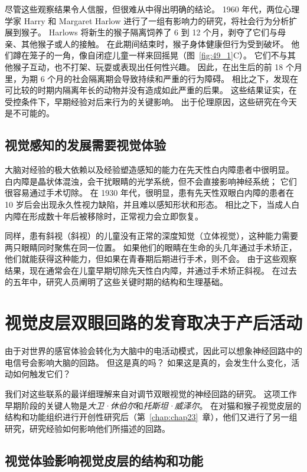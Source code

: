 尽管这些观察结果令人信服，但很难从中得出明确的结论。
1960 年代，两位心理学家 Harry 和 Margaret Harlow 进行了一组有影响力的研究，将社会行为分析扩展到猴子。
Harlows 将新生的猴子隔离饲养了 6 到 12 个月，剥夺了它们与母亲、其他猴子或人的接触。
在此期间结束时，猴子身体健康但行为受到破坏。 他们蹲在笼子的一角，像自闭症儿童一样来回摇晃（图~\ref{fig:49_1}C）。
它们不与其他猴子互动，也不打架、玩耍或表现出任何性兴趣。
因此，在出生后的前 18 个月里，为期 6 个月的社会隔离期会导致持续和严重的行为障碍。
相比之下，发现在可比较的时期内隔离年长的动物并没有造成如此严重的后果。
这些结果证实，在受控条件下，早期经验对后来行为的关键影响。
出于伦理原因，这些研究在今天是不可能的。



\subsection{视觉感知的发展需要视觉体验}

大脑对经验的极大依赖以及经验塑造感知的能力在先天性白内障患者中很明显。
白内障是晶状体混浊，会干扰眼睛的光学系统，但不会直接影响神经系统；
它们很容易通过手术切除。
在 1930 年代，很明显，患有先天性双眼白内障的患者在 10 岁后会出现永久性视力缺陷，并且难以感知形状和形态。
相比之下，当成人白内障在形成数十年后被移除时，正常视力会立即恢复。


同样，患有斜视（斜视）的儿童没有正常的深度知觉（立体视觉），这种能力需要两只眼睛同时聚焦在同一位置。
如果他们的眼睛在生命的头几年通过手术矫正，他们就能获得这种能力，但如果在青春期后期进行手术，则不会。
由于这些观察结果，现在通常会在儿童早期切除先天性白内障，并通过手术矫正斜视。
在过去的五年中，研究人员阐明了这些关键时期的结构和生理基础。



\section{视觉皮层双眼回路的发育取决于产后活动}

由于对世界的感官体验会转化为大脑中的电活动模式，因此可以想象神经回路中的电信号会影响大脑的回路。
但这是真的吗？
如果这是真的，会发生什么变化，活动如何触发它们？


我们对这些联系的最详细理解来自对调节双眼视觉的神经回路的研究。
这项工作早期阶段的关键人物是\textit{大卫·休伯尔}和\textit{托斯坦·威泽尔}。
在对猫和猴子视觉皮层的结构和功能组织进行开创性研究后（第~\ref{chap:chap23}~章），他们又进行了另一组研究，研究经验如何影响他们所描述的回路。



\subsection{视觉体验影响视觉皮层的结构和功能}


